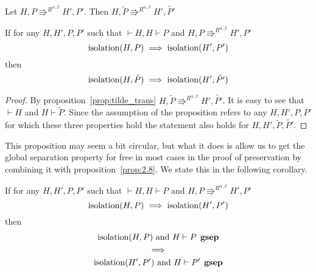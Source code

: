 \begin{proposition} \label{prop:tilde_trans}
  Let $H, P \Rrightarrow^{R^{\alpha, \beta}} H', P'$. Then $H, \tilde{P}
  \Rrightarrow^{R^{\alpha, \beta}} H', \tilde{P'}$
\end{proposition}

\begin{proposition} \label{prop:2.9}
  If for any $H, H', P, P'$ such that $\vdash H, H \vdash P$ and $H, P
  \Rrightarrow^{R^{\alpha, \beta}} H', P'$
  \begin{equation*}
      \mbox{$\mathrm{isolation}$}(H, P) 
      \implies 
      \mbox{$\mathrm{isolation}$}(H', P')
  \end{equation*}
  then
  \begin{equation*}
    \mbox{$\mathrm{isolation}$}(H, \tilde{P}) \implies \mbox{$\mathrm{isolation}$}(H', \tilde{P'})
  \end{equation*}
\end{proposition}

\begin{proof}
  By proposition~\ref{prop:tilde_trans} $H, \tilde{P} \Rrightarrow^{R^{\alpha,
  \beta}} H', \tilde{P'}$. It is easy to see that $\vdash H$ and $H \vdash
  \tilde{P}$.
  Since the assumption of the proposition refers to any $H, H', P, P'$ for which
  these three properties hold the statement also holds for $H, H',
  \tilde{P}, \tilde{P'}$.
\end{proof}

\begin{remark}
  This proposition may seem a bit circular, but what it does is allow us to get
  the global separation property for free in most cases in the proof of
  preservation by combining it with proposition~\ref{prop:2.8}. We state
  this in the following corollary.
\end{remark}

\begin{corollary}
  If for any $H, H', P, P'$ such that $\vdash H, H \vdash P$ and $H, P
  \Rrightarrow^{R^{\alpha, \beta}} H', P'$
  \begin{equation*}
      \mbox{$\mathrm{isolation}$}(H, P) 
      \implies 
      \mbox{$\mathrm{isolation}$}(H', P')
  \end{equation*}
  then
  \begin{equation*}
    \begin{gathered}
      \mbox{$\mathrm{isolation}$}(H, P) \text{ and } H \vdash P \:\: \mbox{\bf gsep} \\
      \implies \\
      \mbox{$\mathrm{isolation}$}(H', P') \text{ and } H \vdash P' \:\: \mbox{\bf gsep}
    \end{gathered}
  \end{equation*}
\end{corollary}


